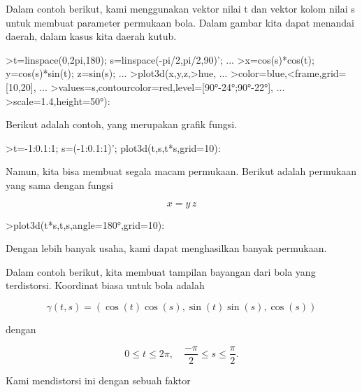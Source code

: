 \documentclass[a4paper,10pt]{article}
\begin{document}
\begin{eulernotebook}
\begin{eulercomment}
Dalam contoh berikut, kami menggunakan vektor nilai t dan vektor kolom
nilai s untuk membuat parameter permukaan bola. Dalam gambar kita
dapat menandai daerah, dalam kasus kita daerah kutub.
\end{eulercomment}
\begin{eulerprompt}
>t=linspace(0,2pi,180); s=linspace(-pi/2,pi/2,90)'; ...
>x=cos(s)*cos(t); y=cos(s)*sin(t); z=sin(s); ...
>plot3d(x,y,z,>hue, ...
>color=blue,<frame,grid=[10,20], ...
>values=s,contourcolor=red,level=[90°-24°;90°-22°], ...
>scale=1.4,height=50°):
\end{eulerprompt}
\begin{eulercomment}
Berikut adalah contoh, yang merupakan grafik fungsi.
\end{eulercomment}
\begin{eulerprompt}
>t=-1:0.1:1; s=(-1:0.1:1)'; plot3d(t,s,t*s,grid=10):
\end{eulerprompt}
\begin{eulercomment}
Namun, kita bisa membuat segala macam permukaan. Berikut adalah
permukaan yang sama dengan fungsi

\end{eulercomment}
\begin{eulerformula}
\[
x = y \, z
\]
\end{eulerformula}
\begin{eulerprompt}
>plot3d(t*s,t,s,angle=180°,grid=10):
\end{eulerprompt}
\begin{eulercomment}
Dengan lebih banyak usaha, kami dapat menghasilkan banyak permukaan.

Dalam contoh berikut, kita membuat tampilan bayangan dari bola yang
terdistorsi. Koordinat biasa untuk bola adalah

\end{eulercomment}
\begin{eulerformula}
\[
\gamma(t,s) = (\cos(t)\cos(s),\sin(t)\sin(s),\cos(s))
\]
\end{eulerformula}
\begin{eulercomment}
dengan

\end{eulercomment}
\begin{eulerformula}
\[
0 \le t \le 2\pi, \quad \frac{-\pi}{2} \le s \le \frac{\pi}{2}.
\]
\end{eulerformula}
\begin{eulercomment}
Kami mendistorsi ini dengan sebuah faktor


\end{eulercomment}
\end{eulernotebook}
\end{document}
